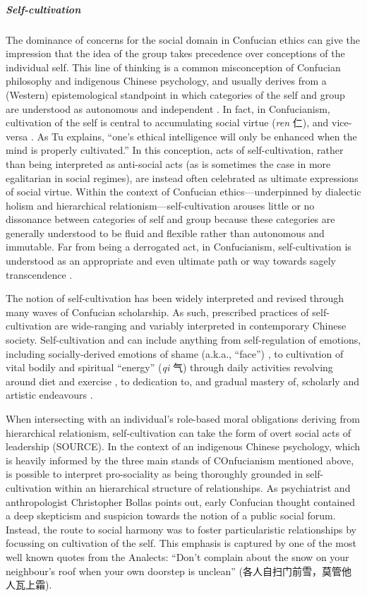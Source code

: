 \begin{CJK}{UTF8}{gbsn}
\subparagraph{Self-cultivation}

The dominance of concerns for the social domain in Confucian ethics can give the impression that the idea of the group takes precedence over conceptions of the individual self.  This line of thinking is a common misconception of Confucian philosophy and indigenous Chinese psychology, and usually derives from a (Western) epistemological standpoint in which categories of the self and group are understood as autonomous and independent \citep{Tu1998}.  In fact, in Confucianism, cultivation of the self is central to accumulating social virtue (\textit{ren} 仁), and vice-versa \citep{Hwang2012}. As Tu explains, ``one's ethical intelligence will only be enhanced when the mind is properly cultivated.''  In this conception, acts of self-cultivation, rather than being interpreted as anti-social acts (as is sometimes the case in more egalitarian in social regimes), are instead often celebrated as ultimate expressions of social virtue.  Within the context of Confucian ethics---underpinned by dialectic holism and hierarchical relationism---self-cultivation arouses little or no dissonance between categories of self and group because these categories are generally understood to be fluid and flexible rather than autonomous and immutable.  Far from being a derrogated act, in Confucianism, self-cultivation is understood as an appropriate and even ultimate path or way towards sagely transcendence \citep[106]{Hwang2012}.

The notion of self-cultivation has been widely interpreted and revised through many waves of Confucian scholarship. As such, prescribed practices of self-cultivation are wide-ranging and variably interpreted in contemporary Chinese society.  Self-cultivation and can include anything from self-regulation of emotions, including socially-derived emotions of shame (a.k.a., ``face'') \citep{Matsumoto2012}, to cultivation of vital bodily and spiritual ``energy'' (\textit{qi} 气) through daily activities revolving around diet and exercise \citep{Farquhar2012}, to dedication to, and gradual mastery of, scholarly and artistic endeavours \citep{Slingerland2000}.

When intersecting with an individual's role-based moral obligations deriving from hierarchical relationism, self-cultivation can take the form of overt social acts of leadership (SOURCE). In the context of an indigenous Chinese psychology, which is heavily informed by the three main stands of COnfucianism mentioned above, is possible to interpret pro-sociality as being thoroughly grounded in self-cultivation within an hierarchical structure of relationships. As psychiatrist and anthropologist Christopher Bollas points out, early Confucian thought contained a deep skepticism and suspicion towards the notion of a public social forum.  Instead, the route to social harmony was to foster particularistic relationships by focussing on cultivation of the self.  This emphasis is captured by one of the most well known quotes from the Analects: ``Don’t complain about the snow on your neighbour’s roof when your own doorstep is unclean''
(各人自扫门前雪，莫管他人瓦上霜).


\end{CJK}

